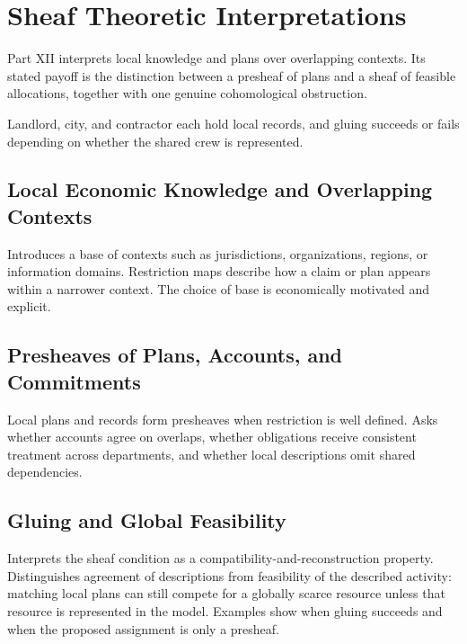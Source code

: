 \part{Sheaf Theoretic Interpretations}
\label{part:XII}

Part XII interprets local knowledge and plans over overlapping contexts. Its stated payoff is the distinction between a presheaf of plans and a sheaf of feasible allocations, together with one genuine cohomological obstruction.

\begin{housing}Landlord, city, and contractor each hold local records, and gluing succeeds or fails depending on whether the shared crew is represented.\end{housing}

\chapter{Local Economic Knowledge and Overlapping Contexts}\label{ch:56}
Introduces a base of contexts such as jurisdictions, organizations, regions, or information domains. Restriction maps describe how a claim or plan appears within a narrower context. The choice of base is economically motivated and explicit.
\scaffold

\chapter{Presheaves of Plans, Accounts, and Commitments}\label{ch:57}
Local plans and records form presheaves when restriction is well defined. Asks whether accounts agree on overlaps, whether obligations receive consistent treatment across departments, and whether local descriptions omit shared dependencies.
\scaffold

\chapter{Gluing and Global Feasibility}\label{ch:58}
Interprets the sheaf condition as a compatibility-and-reconstruction property. Distinguishes agreement of descriptions from feasibility of the described activity: matching local plans can still compete for a globally scarce resource unless that resource is represented in the model. Examples show when gluing succeeds and when the proposed assignment is only a presheaf.
\scaffold


